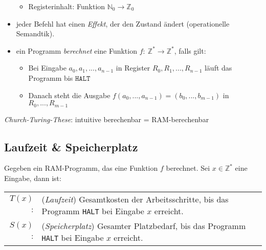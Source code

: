 \begin{itemize}
\begin{itemize}
		 \item Registerinhalt: Funktion $\mathbb{N}_0 \to \mathbb{Z}_0$
		\end{itemize}
	\item jeder Befehl hat einen \emph{Effekt}, der den Zustand ändert (operationelle Semandtik).
	\item ein Programm \emph{berechnet} eine Funktion $f{:}\ \mathbb{Z}^* \to \mathbb{Z}^*$, falls gilt:
		\begin{itemize}
		 \item Bei Eingabe $a_0, a_1, ..., a_{n-1}$ in Register $R_0, R_1, ..., R_{n-1}$ läuft das Programm bis $\texttt{HALT}$
		 \item Danach steht die Ausgabe $f(a_0,...,a_{n-1}) = (b_0,...,b_{m-1})$ in $R_0, ..., R_{m-1}$
		\end{itemize}
    \end{itemize}
	\emph{Church-Turing-These}: intuitive berechenbar = RAM-berechenbar

\subsection{Laufzeit \& Speicherplatz}
\Defi Gegeben ein RAM-Programm, das eine Funktion $f$ berechnet. Sei $x \in \mathbb{Z}^*$ eine Eingabe, dann ist:
\begin{center}
 \begin{tabular}{rp{}}
  $T(x)$: & (\emph{Laufzeit}) Gesamtkosten der Arbeitsschritte, bis das Programm \texttt{HALT} bei Eingabe $x$ erreicht. \\
  $S(x)$: & (\emph{Speicherplatz}) Gesamter Platzbedarf, bis das Programm \texttt{HALT} bei Eingabe $x$ erreicht. 
 \end{tabular}
\end{center}
